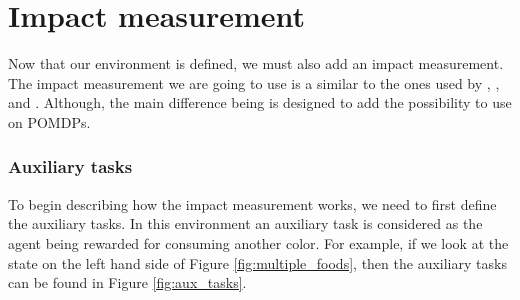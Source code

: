\documentclass[12pt,A4]{report}
\theoremstyle{definition}
\begin{document}
\section{Impact measurement}


Now that our environment is defined, we must also add an impact measurement. The impact measurement we are going to use is a similar to the ones used by \citet{Turner19}, \citet{Krakovna19}, and \citet{Krakovna20}. Although, the main difference being is designed to add the possibility to use on POMDPs.

\subsubsection{Auxiliary tasks}
To begin describing how the impact measurement works, we need to first define the auxiliary tasks. In this environment an auxiliary task is considered as the agent being rewarded for consuming another color. For example, if we look at the state on the left hand side of Figure \ref{fig:multiple_foods}, then the auxiliary tasks can be found in Figure \ref{fig:aux_tasks}.
\end{document}

